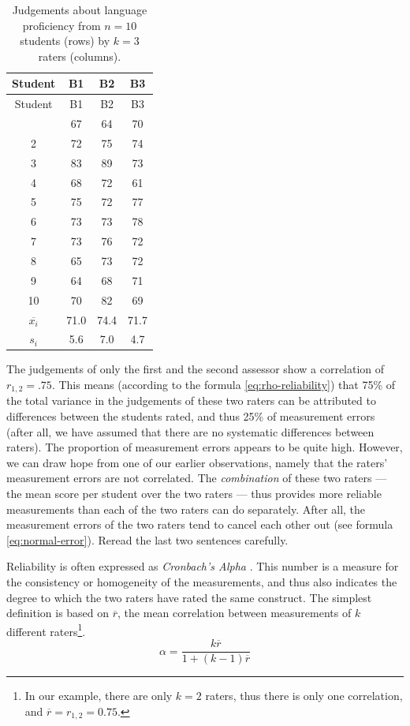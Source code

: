 \documentclass[
]{book}
\begin{document}
\begin{longtable}[]{@{}cccc@{}}
\caption{\label{tab:reliability} Judgements about language proficiency
from \(n = 10\) students (rows) by \(k = 3\) raters (columns).}\tabularnewline
\toprule\noalign{}
Student & B1 & B2 & B3 \\
\midrule\noalign{}
\endfirsthead
\toprule\noalign{}
Student & B1 & B2 & B3 \\
\midrule\noalign{}
\endhead
\bottomrule\noalign{}
\endlastfoot
1 & 67 & 64 & 70 \\
2 & 72 & 75 & 74 \\
3 & 83 & 89 & 73 \\
4 & 68 & 72 & 61 \\
5 & 75 & 72 & 77 \\
6 & 73 & 73 & 78 \\
7 & 73 & 76 & 72 \\
8 & 65 & 73 & 72 \\
9 & 64 & 68 & 71 \\
10 & 70 & 82 & 69 \\
\(\overline{x_i}\) & 71.0 & 74.4 & 71.7 \\
\(s_i\) & 5.6 & 7.0 & 4.7 \\
\end{longtable}

The judgements of only the first and the second assessor show a
correlation of \(r_{1,2}=.75\). This means (according to the formula
\eqref{eq:rho-reliability}) that 75\% of the total variance in the
judgements of these two raters can be attributed to differences
between the students rated, and thus 25\% of measurement errors (after all,
we have assumed that there are no systematic differences between
raters). The proportion of measurement errors appears to be quite high.
However, we can draw hope from one of our earlier observations, namely that
the raters' measurement errors are not correlated. The
\emph{combination} of these two raters --- the mean score per student
over the two raters --- thus provides more reliable measurements
than each of the two raters can do separately. After all, the
measurement errors of the two raters tend to cancel each other out
(see formula \eqref{eq:normal-error}).
Reread the last two sentences carefully.

Reliability is often expressed as \emph{Cronbach's Alpha}
\citep{Cort93}. This number is a measure for the consistency or homogeneity
of the measurements, and thus also indicates the degree to which the two
raters have rated the same construct. The simplest definition is
based on \(\overline{r}\), the mean correlation between
measurements of \(k\) different raters\footnote{In our example, there are only \(k=2\) raters, thus there is only one
  correlation, and \(\overline{r} = r_{1,2} = 0.75\).}.
\begin{equation}
  \label{eq:cronbach-corr}
  \alpha = \frac{k \overline{r}} {1+(k-1)\overline{r}}
\end{equation}
\end{document}
